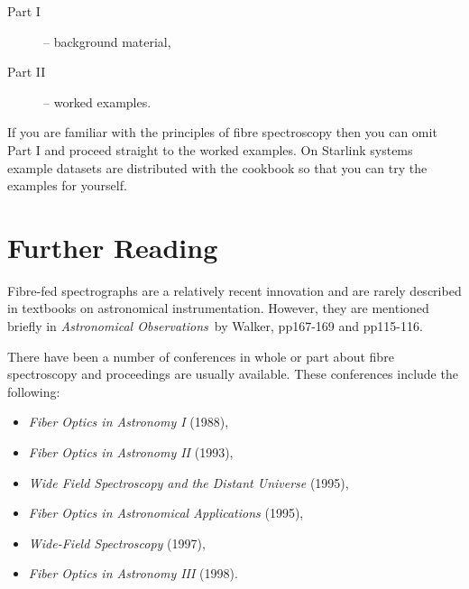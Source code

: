 \documentclass[twoside,11pt]{starlink}
\begin{document}
\begin{description}

  \item[{\rm Part I}] -- background material,

  \item[{\rm Part II}] -- worked examples.

\end{description}

If you are familiar with the principles of fibre spectroscopy then
you can omit Part I and proceed straight to the worked examples.  On
Starlink systems example datasets are distributed with the cookbook
so that you can try the examples for yourself.


\section{\label{FURTHER}Further Reading}

Fibre-fed spectrographs are a relatively recent innovation and are
rarely described in textbooks on astronomical instrumentation.  However,
they are mentioned briefly in \textit{Astronomical Observations}\, by
Walker\cite{WALKER87}, pp167-169 and pp115-116.

There have been a number of conferences in whole or part about fibre
spectroscopy and proceedings are usually available.  These conferences
include the following:

\begin{itemize}

  \item \textit{Fiber Optics in Astronomy I}\/\cite{BARDEN88} (1988),

  \item \textit{Fiber Optics in Astronomy II}\/\cite{GRAY93} (1993),

  \item \textit{Wide Field Spectroscopy and the Distant
   Universe}\/\cite{MADDOX95} (1995),

  \item \textit{Fiber Optics in Astronomical Applications}\/\cite{BARDEN95}
   (1995),

  \item \textit{Wide-Field Spectroscopy}\/\cite{KONTIZAS97} (1997),

  \item \textit{Fiber Optics in Astronomy III}\/\cite{ARRIBAS98} (1998).

\end{itemize}
\end{document}
